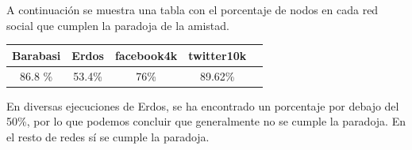 \documentclass[spanish]{assignment}
\begin{document}
	A continuación se muestra una tabla con el porcentaje de nodos en cada red social que cumplen la paradoja de la amistad.
	\begin{center}
		\begin{tabular}{|c|c|c|c|c|}
			\hline
			\textbf{Barabasi} & \textbf{Erdos} & \textbf{facebook4k} & \textbf{twitter10k} \\ 
			\hline
			86.8 \% & 53.4\% & 76\% & 89.62\% \\
			\hline
		\end{tabular}
	\end{center}
	En diversas ejecuciones de Erdos, se ha encontrado un porcentaje por debajo del 50\%, por lo que podemos concluir que generalmente no se cumple la paradoja.
	En el resto de redes sí se cumple la paradoja.
	
\end{document}
